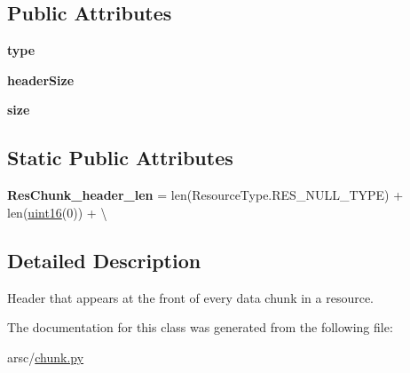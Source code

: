\subsection*{Public Attributes}
\begin{DoxyCompactItemize}
\item 
\mbox{\label{classchunk_1_1ResChunk__header_aea0644b6c3193d4ddf4f42ee99eb0058}} 
{\bfseries type}
\item 
\mbox{\label{classchunk_1_1ResChunk__header_a87d00b369bf823ac7e7d9c3c83c3a68e}} 
{\bfseries header\+Size}
\item 
\mbox{\label{classchunk_1_1ResChunk__header_a8314b1d5af69e234ee656d451a311b1d}} 
{\bfseries size}
\end{DoxyCompactItemize}
\subsection*{Static Public Attributes}
\begin{DoxyCompactItemize}
\item 
\mbox{\label{classchunk_1_1ResChunk__header_aa5e9aabbadc53e0a225ba4f737343ec6}} 
{\bfseries Res\+Chunk\+\_\+header\+\_\+len} = len(Resource\+Type.\+R\+E\+S\+\_\+\+N\+U\+L\+L\+\_\+\+T\+Y\+PE) + len(\mbox{\hyperlink{classtype_1_1uint16_1_1uint16}{uint16}}(0)) + \textbackslash{}
\end{DoxyCompactItemize}


\subsection{Detailed Description}
Header that appears at the front of every data chunk in a resource. 



The documentation for this class was generated from the following file\+:\begin{DoxyCompactItemize}
\item 
arsc/\mbox{\hyperlink{chunk_8py}{chunk.\+py}}\end{DoxyCompactItemize}
